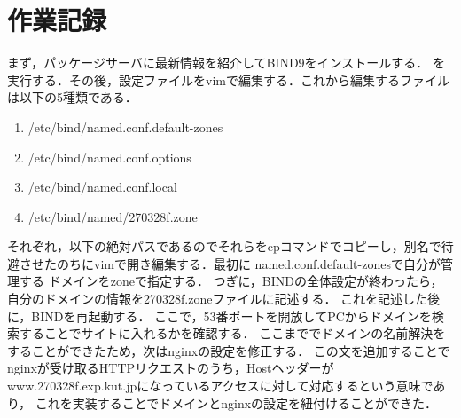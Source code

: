 \documentclass[divpdfmx]{jlreq}
\begin{document}
\section{作業記録}
まず，パッケージサーバに最新情報を紹介してBIND9をインストールする．
を実行する．その後，設定ファイルをvimで編集する．これから編集するファイルは以下の5種類である．
\begin{enumerate}
    \item /etc/bind/named.conf.default-zones
    \item /etc/bind/named.conf.options
    \item /etc/bind/named.conf.local
    \item /etc/bind/named/270328f.zone
\end{enumerate}
それぞれ，以下の絶対パスであるのでそれらをcpコマンドでコピーし，別名で待避させたのちにvimで開き編集する．最初に named.conf.default-zonesで自分が管理する
ドメインをzoneで指定する．
つぎに，BINDの全体設定が終わったら，自分のドメインの情報を270328f.zoneファイルに記述する．
これを記述した後に，BINDを再起動する．
ここで，53番ポートを開放してPCからドメインを検索することでサイトに入れるかを確認する．
ここまででドメインの名前解決をすることができたため，次はnginxの設定を修正する．
この文を追加することでnginxが受け取るHTTPリクエストのうち，Hostヘッダーがwww.270328f.exp.kut.jpになっているアクセスに対して対応するという意味であり，
これを実装することでドメインとnginxの設定を紐付けることができた．
\end{document}
